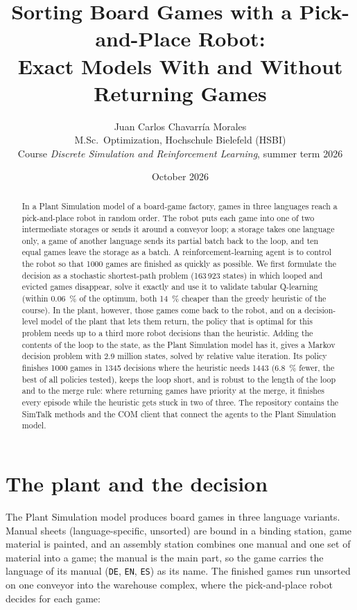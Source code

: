 \documentclass[11pt,a4paper]{article}
\title{Sorting Board Games with a Pick-and-Place Robot:\\ Exact Models With and Without Returning Games}
\author{Juan Carlos Chavarr\'ia Morales\\[2pt]
  \small M.Sc.\ Optimization, Hochschule Bielefeld (HSBI)\\
  \small Course \emph{Discrete Simulation and Reinforcement Learning}, summer term 2026}
\date{October 2026}
\begin{document}
\maketitle

\begin{abstract}
In a Plant Simulation model of a board-game factory, games in three languages reach a pick-and-place robot in
random order. The robot puts each game into one of two intermediate storages or sends it around a conveyor loop;
a storage takes one language only, a game of another language sends its partial batch back to the loop, and ten
equal games leave the storage as a batch. A reinforcement-learning agent is to control the robot so that 1000
games are finished as quickly as possible. We first formulate the decision as a stochastic shortest-path problem
(163\,923 states) in which looped and evicted games disappear, solve it exactly and use it to validate tabular
Q-learning (within \SI{0.06}{\percent} of the optimum, both \SI{14}{\percent} cheaper than the greedy heuristic of the
course). In the plant, however, those games come back to the robot, and on a decision-level model of the plant
that lets them return, the policy that is optimal for this problem needs up to a third more robot decisions than the
heuristic. Adding the contents of the loop to the state, as the Plant Simulation model has it, gives a Markov
decision problem with 2.9 million states, solved by relative value iteration. Its policy finishes 1000 games in
1345 decisions where the heuristic needs 1443 (\SI{6.8}{\percent} fewer, the best of all policies tested), keeps the
loop short, and is robust to the length of the loop and to the merge rule: where returning games have priority at
the merge, it finishes every episode while the heuristic gets stuck in two of three. The repository contains the
SimTalk methods and the COM client that connect the agents to the Plant Simulation model.
\end{abstract}

\section{The plant and the decision}

The Plant Simulation model \citep{Bangsow2020} produces board games in three language variants. Manual sheets
(language-specific, unsorted) are bound in a binding station, game material is painted, and an assembly station
combines one manual and one set of material into a game; the manual is the main part, so the game carries the
language of its manual (\texttt{DE}, \texttt{EN}, \texttt{ES}) as its name. The finished games run unsorted on one
conveyor into the warehouse complex, where the pick-and-place robot decides for each game:
\end{document}
